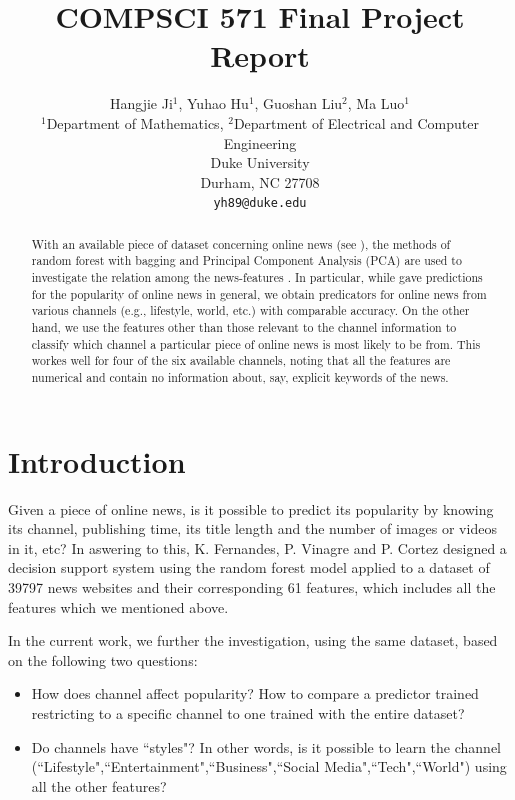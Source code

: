 \documentclass{article} %
\title{COMPSCI 571 Final Project Report}
\author{
Hangjie Ji$^1$, Yuhao Hu$^1$, Guoshan Liu$^2$, Ma Luo$^1$\\
$^1$Department of Mathematics, $^2$Department of Electrical and Computer Engineering\\
Duke University\\
Durham, NC 27708 \\
\texttt{yh89@duke.edu} \\
}
\begin{document}
\maketitle

\begin{abstract}
      With an available piece of dataset concerning online news (see \cite{FVC14}), 
      the methods of random forest with bagging and Principal Component Analysis (PCA) are used to 
      investigate the relation among the news-features . In particular, while \cite{FVC14} gave predictions for the popularity of online news in general, we
      obtain predicators for online news from various channels (e.g., lifestyle, world, etc.) with comparable accuracy. On the other hand, we use the features 
      other than those relevant to the channel information to classify which channel a particular piece of online news is most likely to be from. This workes well for
      four of the six available channels, noting that all the features are numerical and contain no information about, say, explicit keywords of the news.
\end{abstract}

\section{Introduction}
Given a piece of online news, is it possible to predict its popularity by knowing its channel, publishing time, its title length and the number of images or videos in it, etc?
In aswering to this, K. Fernandes, P. Vinagre and P. Cortez \cite{FVC14} designed a decision support system using the random forest model applied to a dataset of 39797 news websites and their corresponding 61 features, which includes all the features which we mentioned above. 

In the current work, we further the investigation, using the same dataset, based on the following two questions: 

\begin{itemize}
\item{How does channel affect popularity? How to compare a predictor trained restricting to a specific channel to one trained with the entire dataset? }
\item{Do channels have ``styles"? In other words, is it possible to learn the channel (``Lifestyle",``Entertainment",``Business",``Social Media",``Tech",``World") using all  the other features?}
\end{itemize}
\end{document}

